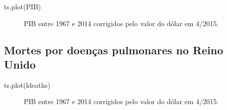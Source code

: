 \documentclass[
  letterpaper,
  DIV=11,
  numbers=noendperiod]{scrartcl}
\newenvironment{Shaded}{\begin{snugshade}}{\end{snugshade}}
\newcommand{\FunctionTok}[1]{\textcolor[rgb]{0.28,0.35,0.67}{#1}}
\newcommand{\NormalTok}[1]{\textcolor[rgb]{0.00,0.23,0.31}{#1}}
\theoremstyle{plain}
\theoremstyle{plain}
\theoremstyle{definition}
\theoremstyle{definition}
\theoremstyle{remark}
\begin{document}
\begin{Shaded}
\begin{Highlighting}[]
\FunctionTok{ts.plot}\NormalTok{(PIB)}
\end{Highlighting}
\end{Shaded}

\begin{figure}

\begin{minipage}[t]{\linewidth}

{\centering 


\caption{PIB entre 1967 e 2014 corrigidos pelo valor do dólar em
4/2015.}

}

\end{minipage}%

\end{figure}

\hypertarget{mortes-por-doenuxe7as-pulmonares-no-reino-unido}{%
\subsection{Mortes por doenças pulmonares no Reino
Unido}\label{mortes-por-doenuxe7as-pulmonares-no-reino-unido}}

\begin{Shaded}
\begin{Highlighting}[]
\FunctionTok{ts.plot}\NormalTok{(ldeaths)}
\end{Highlighting}
\end{Shaded}

\begin{figure}

\begin{minipage}[t]{\linewidth}

{\centering 


\caption{PIB entre 1967 e 2014 corrigidos pelo valor do dólar em
4/2015.}

}

\end{minipage}%

\end{figure}
\end{document}
